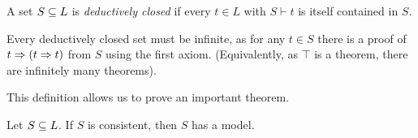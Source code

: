 \documentclass{article}
\begin{document}
\begin{definition}
    A set $S \subseteq L$ is \textit{deductively closed} if every $t \in L$ with $S \vdash t$ is itself contained in $S$.
\end{definition}

\begin{note}
	Every deductively closed set must be infinite, as for any $t \in S$ there is a proof of $t \Rightarrow (t \Rightarrow t)$ from $S$ using the first axiom. (Equivalently, as $\top$ is a theorem, there are infinitely many theorems).
\end{note}

This definition allows us to prove an important theorem.

\begin{theorem}
	\label{propositional-model-existence-lemma}
    Let $S \subseteq L$. If $S$ is consistent, then $S$ has a model.
\end{theorem}
\end{document}
